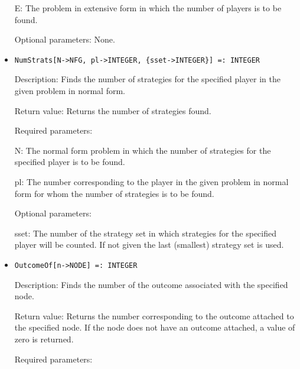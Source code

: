 \begin{itemize}
\bd
\item
[E:] The problem in extensive form in which the number of players is
to be found.
\ed

\item   
[Optional parameters:] None.
\ed

\item
\protect \large \begin{verbatim}
NumStrats[N->NFG, pl->INTEGER, {sset->INTEGER}] =: INTEGER
\end{verbatim}\normalsize

\bd

\item
[Description:] Finds the number of strategies for the specified player
in the given problem in normal form.
\item
[Return value:] Returns the number of strategies found.
\item
[Required parameters:]\hfil\null

\bd
\item
[N:] The normal form problem in which the number of strategies for the
specified player is to be found.
\item
[pl:] The number corresponding to the player in the given problem in
normal form for whom the number of strategies is to be found.
\ed

\item
[Optional parameters:]\hfil\null
	
\bd
\item  
[sset:] The number of the strategy set in which strategies for the
specified player will be counted.  If not given the last (smallest)
strategy set is used.

\ed
\ed

\item

\protect \large \begin{verbatim}
OutcomeOf[n->NODE] =: INTEGER
\end{verbatim}\normalsize

\bd

\item
[Description:] Finds the number of the outcome associated with the
specified node.
\item
[Return value:] Returns the number corresponding to the outcome
attached to the specified node.  If the node does not have an outcome
attached, a value of zero is returned.
\item
[Required parameters:]\hfil\null
	

\end{itemize}
